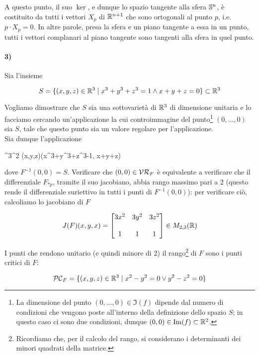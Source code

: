 A questo punto, il suo $ \ker $, e dunque lo spazio tangente alla sfera $ \S^{n} $, è costituito da tutti i vettori $ X_{p} $ di $ \R^{n+1} $ che sono ortogonali al punto $ p $, i.e. $ p \cdot X_{p} = 0 $. In altre parole, presa la sfera e un piano tangente a essa in un punto, tutti i vettori complanari al piano tangente sono tangenti alla sfera in quel punto.

\paragraph{3)}\label{example:subvar-cond}

Sia l'insieme

\begin{equation}
	S = \{ (x,y,z) \in \R^{3} \mid x^{3} + y^{3} + z^{3} = 1 \wedge x+y+z=0 \} \subset \R^{3}
\end{equation}

Vogliamo dimostrare che $ S $ sia una sottovarietà di $ \R^{3} $ di dimensione unitaria e lo facciamo cercando un'applicazione la cui controimmagine del punto\footnote{%
	La dimensione del punto $ (0,\dots,0) \in \Im(f) $ dipende dal numero di condizioni che vengono poste all'interno della definizione dello spazio $ S $; in questo caso ci sono due condizioni, dunque $ (0,0) \in \Im(f) \subset \R^{2} $.%
} $ (0,\dots,0) $ sia $ S $, tale che questo punto sia un valore regolare per l'applicazione. \\
Sia dunque l'applicazione

	{\R^{3}}{\R^{2}}
	{(x,y,z)}{(x^{3}+y^{3}+z^{3}-1, x+y+z)}

dove $ F^{-1}(0,0) = S $. Verificare che $ (0,0) \in \VR_{F} $ è equivalente a verificare che il differenziale $ F_{*p} $, tramite il suo jacobiano, abbia rango massimo pari a 2 (questo rende il differenziale suriettivo in tutti i punti di $ F^{-1}(0,0) $): per verificare ciò, calcoliamo lo jacobiano di $ F $

\begin{equation}
	J(F)(x,y,x) = \bmqty{ 3x^{2} & 3y^{2} & 3z^{2} \\ \\ 1 & 1 & 1 }\in M_{2,3}(\R)
\end{equation}

I punti che rendono unitario (e quindi minore di 2) il rango\footnote{%
	Ricordiamo che, per il calcolo del rango, si considerano i determinanti dei minori quadrati della matrice.%
} di $ F $ sono i punti critici di $ F $:

\begin{equation}
	\PC_{F} = \{ (x,y,z) \in \R^{3} \mid x^{2}-y^{2}=0 \lor y^{2}-z^{2}=0 \}
\end{equation}


